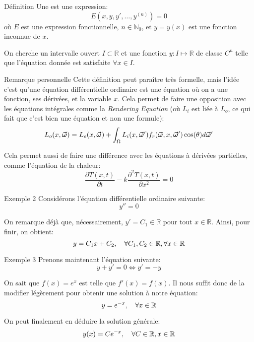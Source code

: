 \documentclass[a4paper]{article}
\begin{document}
\begin{parag}{Définition}
    Une  est une expression: 
    \[E\left(x, y, y', \ldots, y^{\left(n\right)}\right) = 0\]
    où $E$ est une expression fonctionnelle, $n \in \mathbb{N}_0$, et $y = y\left(x\right)$ est une fonction inconnue de $x$.

    On cherche un intervalle ouvert $I \subset \mathbb{R}$ et une fonction $y : I \mapsto \mathbb{R}$ de classe $C^n$ telle que l'équation donnée est satisfaite $\forall x \in I$.

    \begin{subparag}{Remarque personnelle}
        Cette définition peut paraître très formelle, mais l'idée c'est qu'une équation différentielle ordinaire est une équation où on a une fonction, ses dérivées, et la variable $x$. Cela permet de faire une opposition avec les équations intégrales comme la \textit{Rendering Equation} (où $L_i$ est liée à $L_o$, ce qui fait que c'est bien une équation et non une formule): 
        \[L_o(x, \bm{\protect\vec{\omega}}) = L_e(x, \bm{\protect\vec{\omega}}) + \int_\Omega{L_i(x, \bm{\protect\vec{\omega}}')}f_r(\bm{\protect\vec{\omega}}, x, \bm{\protect\vec{\omega}}')\cos(\theta)d\bm{\protect\vec{\omega}}'\]
        
        Cela permet aussi de faire une différence avec les équations à dérivées partielles, comme l'équation de la chaleur: 
        \[\frac{\partial T\left(x, t\right)}{\partial t} - k \frac{\partial^2 T\left(x, t\right)}{\partial x^2} = 0\]
    \end{subparag}
    
\end{parag}

\begin{parag}{Exemple 2}
    Considérons l'équation différentielle ordinaire suivante: 
    \[y'' = 0\]
    
    On remarque déjà que, nécessairement, $y' = C_1 \in \mathbb{R}$ pour tout $x \in \mathbb{R}$. Ainsi, pour finir, on obtient: 
    \[y = C_1 x + C_2, \quad \forall C_1, C_2 \in \mathbb{R}, \forall x \in \mathbb{R}\]
\end{parag}

\begin{parag}{Exemple 3}
    Prenons maintenant l'équation suivante: 
    \[y + y' = 0 \iff y' = -y\]
    
    On sait que $f\left(x\right) = e^x$ est telle que $f'\left(x\right) = f\left(x\right)$. Il nous suffit donc de la modifier légèrement pour obtenir une solution à notre équation: 
    \[y = e^{-x}, \quad \forall x \in \mathbb{R}\]
    
    On peut finalement en déduire la solution générale: 
    \[y\left(x\right) = Ce^{-x}, \mathspace \forall C \in \mathbb{R}, x \in \mathbb{R}\]
\end{parag}
\end{document}
